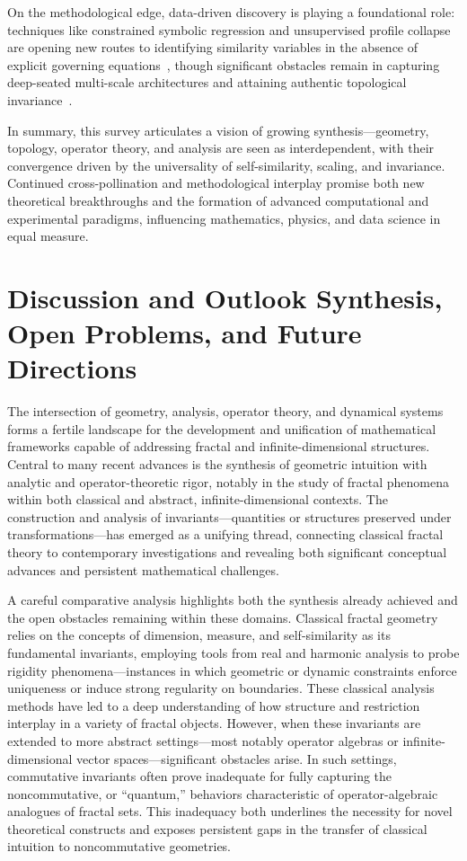 \documentclass[sigconf]{acmart}
\begin{document}
On the methodological edge, data-driven discovery is playing a foundational role: techniques like constrained symbolic regression and unsupervised profile collapse are opening new routes to identifying similarity variables in the absence of explicit governing equations~\cite{ref65}, though significant obstacles remain in capturing deep-seated multi-scale architectures and attaining authentic topological invariance~\cite{ref26, ref30}.

In summary, this survey articulates a vision of growing synthesis---geometry, topology, operator theory, and analysis are seen as interdependent, with their convergence driven by the universality of self-similarity, scaling, and invariance. Continued cross-pollination and methodological interplay promise both new theoretical breakthroughs and the formation of advanced computational and experimental paradigms, influencing mathematics, physics, and data science in equal measure.

\section{Discussion and Outlook Synthesis, Open Problems, and Future Directions}

The intersection of geometry, analysis, operator theory, and dynamical systems forms a fertile landscape for the development and unification of mathematical frameworks capable of addressing fractal and infinite-dimensional structures. Central to many recent advances is the synthesis of geometric intuition with analytic and operator-theoretic rigor, notably in the study of fractal phenomena within both classical and abstract, infinite-dimensional contexts. The construction and analysis of invariants—quantities or structures preserved under transformations—has emerged as a unifying thread, connecting classical fractal theory to contemporary investigations and revealing both significant conceptual advances and persistent mathematical challenges.

A careful comparative analysis highlights both the synthesis already achieved and the open obstacles remaining within these domains. Classical fractal geometry relies on the concepts of dimension, measure, and self-similarity as its fundamental invariants, employing tools from real and harmonic analysis to probe rigidity phenomena—instances in which geometric or dynamic constraints enforce uniqueness or induce strong regularity on boundaries. These classical analysis methods have led to a deep understanding of how structure and restriction interplay in a variety of fractal objects. However, when these invariants are extended to more abstract settings—most notably operator algebras or infinite-dimensional vector spaces—significant obstacles arise. In such settings, commutative invariants often prove inadequate for fully capturing the noncommutative, or ``quantum,'' behaviors characteristic of operator-algebraic analogues of fractal sets. This inadequacy both underlines the necessity for novel theoretical constructs and exposes persistent gaps in the transfer of classical intuition to noncommutative geometries.
\end{document}
